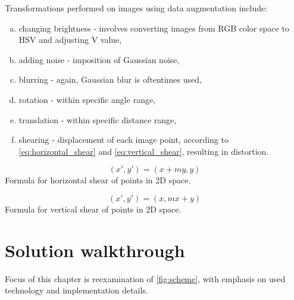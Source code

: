 \documentclass[11pt]{article}
\begin{document}
Transformations performed on images using data augmentation include:
\begin{enumerate}[a)]
\item changing brightness - involves converting images from RGB color space to HSV \cite{hsv_def} and adjusting V value,
\item adding noise - imposition of Gaussian noise,
\item blurring - again, Gaussian blur is oftentimes used,
\item rotation - within specific angle range,
\item translation - within specific distance range,
\item shearing - displacement of each image point, according to \autoref{eq:horizontal_shear} and \ref{eq:vertical_shear}, resulting in distortion.
\end{enumerate}

\begin{equation} \label{eq:horizontal_shear}
(x', y') = (x + my, y)
\end{equation}
Formula for horizontal shear of points in 2D space.

\begin{equation} \label{eq:vertical_shear}
(x', y')=(x, mx +y)
\end{equation}
Formula for vertical shear of points in 2D space.
\clearpage

\section{Solution walkthrough} \label{solution_walkthrough}
Focus of this chapter is reexamination of \autoref{fig:scheme}, with emphasis on used technology and implementation details.
\end{document}
